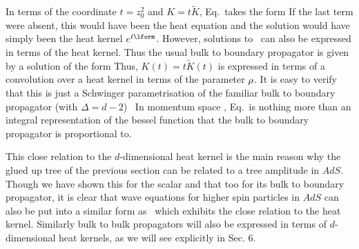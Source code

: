 In terms of the coordinate $t=z_0^2$ and $K=t\tilde{K}$, Eq.\adswv\ takes the form
\eqn{}
If the last term were absent, this would have been the heat equation and the solution would 
have simply been the heat kernel $e^{t\lform}$. However, solutions to \adseq\ can also be
expressed in terms of the heat kernel. Thus the usual bulk to boundary 
propagator is given by a solution of the form 
\eqn{}
Thus, $K(t)=t\tilde{K}(t)$ is expressed in terms of a convolution over a heat kernel
in terms of the parameter ${\rho}$. It is easy to verify that this is just a Schwinger 
parametrisation
of the familiar bulk to boundary propagator (with $\Delta=d-2$)\witads\ 
\eqn{}
In momentum space \gkp , Eq.\htk\ is nothing more than an integral representation of the bessel 
function that the bulk to boundary propagator is proportional to.  


This close relation to the $d$-dimensional heat kernel 
is the main reason why the glued up tree of the previous section can be related to a tree
amplitude in $AdS$. Though we have shown this for the scalar and that too for its bulk to
boundary propagator, it is clear that wave equations for higher spin particles in $AdS$
can also be put into a similar form as \adseq\ which exhibits the close relation to 
the heat kernel. Similarly bulk to bulk propagators will also be expressed in terms of 
$d$-dimensional heat kernels, as we will see explicitly in Sec. 6.  
 


